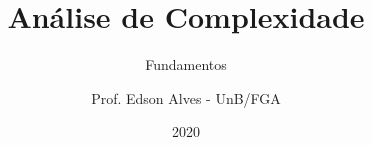 \title{Análise de Complexidade}
\subtitle{Fundamentos}
\author{Prof. Edson Alves - UnB/FGA}
\date{2020}
